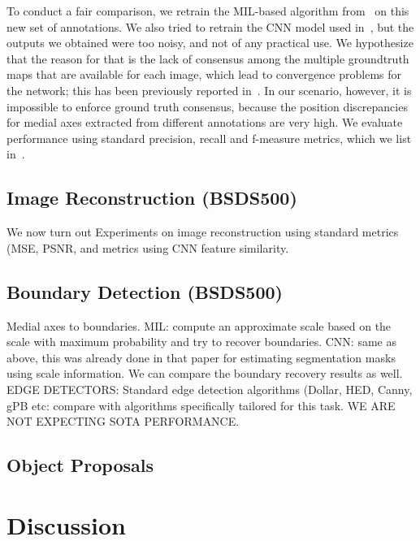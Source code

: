 \documentclass[10pt,twocolumn,letterpaper]{article}
\begin{document}
To conduct a fair comparison, we retrain the MIL-based algorithm from~\cite{tsogkas2012learning} on this new set 
of annotations.
We also tried to retrain the CNN model used in~\cite{shen2016object}, but the outputs we obtained were too noisy, 
and not of any practical use.
We hypothesize that the reason for that is the lack of consensus among the multiple groundtruth maps that are
available for each image, which lead to convergence problems for the network; this has been previously
reported in~\cite{xie2015holistically}.
In our scenario, however, it is impossible to enforce ground truth consensus, because the position discrepancies
for medial axes extracted from different annotations are very high.
We evaluate performance using standard precision, recall and f-measure metrics, 
which we list in~.




\subsection{Image Reconstruction (BSDS500)}\label{sec:experiments:reconstruction}
We now turn out
Experiments on image reconstruction using standard metrics (MSE, PSNR, and metrics using CNN feature similarity.

\subsection{Boundary Detection (BSDS500)}\label{sec:experiments:edges}
Medial axes to boundaries. 
MIL: compute an approximate scale based on the scale with maximum probability and try to recover boundaries.
CNN: same as above, this was already done in that paper for estimating segmentation masks using scale information.
We can compare the boundary recovery results as well.
EDGE DETECTORS: Standard edge detection algorithms (Dollar, HED, Canny, gPB etc: compare with algorithms specifically
tailored for this task. WE ARE NOT EXPECTING SOTA PERFORMANCE.

\subsection{Object Proposals}\label{sec:experiments:proposals}








\section{Discussion}\label{sec:discussion}

{\small


}
\end{document}
